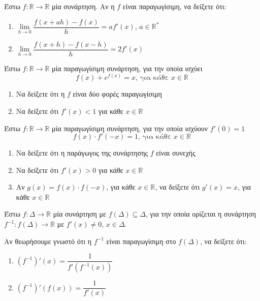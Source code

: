 \documentclass{presentation}
\begin{document}
\begin{askisi}
    Έστω $f:\mathbb{R}\to\mathbb{R}$ μία συνάρτηση. Αν η $f$ είναι παραγωγίσιμη, να δείξετε ότι:
    \begin{enumerate}
        \item<1-> $\lim\limits_{h \to 0}{ \dfrac{f(x+ah)-f(x)}{h} }=af'(x)$, $a\in\mathbb{R}^*$
        \item<2-> $\lim\limits_{h \to 0}{ \dfrac{f(x+h)-f(x-h)}{h} }=2f'(x)$
    \end{enumerate}

\end{askisi}

\begin{askisi}
    Έστω $f:\mathbb{R}\to\mathbb{R}$ μία παραγωγίσιμη συνάρτηση, για την οποία ισχύει
    $$f(x)+e^{f(x)}=x \text{, για κάθε } x\in\mathbb{R}$$
    \begin{enumerate}
        \item<1-> Να δείξετε ότι η $f$ είναι δύο φορές παραγωγίσιμη
        \item<2-> Να δείξετε ότι $f'(x)<1$ για κάθε $x\in\mathbb{R}$
    \end{enumerate}

\end{askisi}

\begin{askisi}
    Έστω $f:\mathbb{R}\to\mathbb{R}$ μία παραγωγίσιμη συνάρτηση, για την οποία ισχύουν $f'(0)=1$
    $$f(x)\cdot f'(-x)=1 \text{, για κάθε } x\in\mathbb{R}$$
    \begin{enumerate}
        \item<1-> Να δείξετε ότι η παράγωγος της συνάρτησης $f$ είναι συνεχής
        \item<2-> Να δείξετε ότι $f'(x)>0$ για κάθε $x\in\mathbb{R}$
        \item<3-> Αν $g(x)=f(x)\cdot f(-x)$, για κάθε $x\in\mathbb{R}$, να δείξετε ότι $g'(x)=x$, για κάθε $x\in\mathbb{R}$
    \end{enumerate}

\end{askisi}

\begin{askisi}
    Έστω $f:Δ\to\mathbb{R}$ μία συνάρτηση με $f(Δ)\subseteq Δ$, για την οποία ορίζεται η συνάρτηση $f^{-1}:f(Δ)\to\mathbb{R}$ με $f'(x)\ne 0$, $x\in Δ$.

    Αν θεωρήσουμε γνωστό ότι η $f^{-1}$ είναι παραγωγίσιμη στο $f(Δ)$, να δείξετε ότι:
    \begin{enumerate}
        \item<1-> $(f^{-1})'(x)=\dfrac{1}{f'(f^{-1}(x))}$
        \item<2-> $(f^{-1})'(f(x))=\dfrac{1}{f'(x)}$
    \end{enumerate}

\end{askisi}
\end{document}
